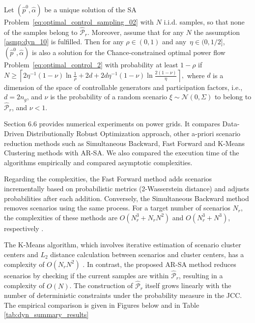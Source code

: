 \begin{theorem}\label{thm:dyn_40}
Let $(\hat{p}^0, \hat{\alpha})$ be a unique solution of the SA Problem~\eqref{eq:optimal_control_sampling_02} with $N$ i.i.d. samples, so that none of the samples belong to $\hat{\mathcal{P}}_{r}$. Moreover, assume that for any $N$ the assumption \ref{asmp:dyn_10} is fulfilled. Then for any $\rho \in (0,1)$ and any~$\eta \in (0, 1/2]$, $(\hat{p}^0, \hat{\alpha})$ is also a solution for the Chance-constrained optimal power flow Problem~\eqref{eq:optimal_control_2} with probability at least $1-\rho$ if 
$%
  N \ge \left\lceil 2\eta^{-1}(1-\nu)\ln \frac{1}{\rho} + 2d + 2d\eta^{-1}(1-\nu) \ln\frac{2(1-\nu)}{\eta} \right\rceil, 
$%
 where $d$ is a dimension of the space of controllable generators and participation factors, i.e., $d = 2 n_g$, and $\nu$ is the probability of a random scenario $\xi \sim \mathcal{N}(0, \Sigma)$ to belong to $\hat{\mathcal{P}}_{r}$, and $\nu < 1$. 
\end{theorem}

Section 6.6 provides numerical experiments on power grids. It compares Data-Driven Distributionally Robust Optimization approach, other a-priori scenario reduction methods such as Simultaneous Backward, Fast Forward and K-Means Clustering methods with AR-SA. 
We also compared the execution time of the algorithms empirically and compared asymptotic complexities.

Regarding the complexities, the Fast Forward method adds scenarios incrementally based on probabilistic metrics (2-Wasserstein distance) and adjusts probabilities after each addition. Conversely, the Simultaneous Backward method removes scenarios using the same process. For a target number of scenarios $N_r$, the complexities of these methods are $O(N_r^3 + N_r N^2)$ and $O(N_r^3 + N^3)$, respectively \cite{heitsch2003scenario, rujeerapaiboon2022scenario}.

The K-Means algorithm, which involves iterative estimation of scenario cluster centers and $L_2$ distance calculation between scenarios and cluster centers, has a complexity of $O(N_rN^2)$ \cite{pakhira2014linear}. In contrast, the proposed AR-SA method reduces scenarios by checking if the current samples are within $\hat{\mathcal{P}}_r$, resulting in a complexity of $O(N)$. The construction of $\hat{\mathcal{P}}_r$ itself grows linearly with the number of deterministic constraints under the probability measure in the JCC.
The empirical comparison is given in Figures below and in Table \ref{tab:dyn_summary_results}

